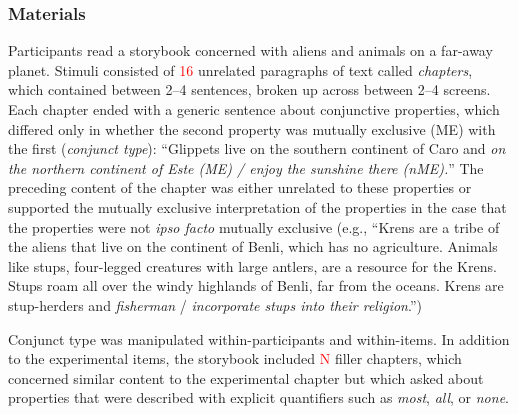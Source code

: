 \documentclass[10pt,letterpaper]{article}
\newcommand{\red}[1]{{\textcolor{Red}{#1}}}
\begin{document}
\subsubsection{Materials}

Participants read a storybook concerned with aliens and animals on a far-away planet.
Stimuli consisted of \red{16} unrelated paragraphs of text called \emph{chapters}, which contained between 2--4 sentences, broken up across between 2--4 screens.
Each chapter ended with a generic sentence about conjunctive properties, which differed only in whether the second property was mutually exclusive (ME) with the first (\emph{conjunct type}): ``Glippets live on the southern continent of Caro and \emph{on the northern continent of Este (ME) /  enjoy the sunshine there (nME).}''
The preceding content of the chapter was either unrelated to these properties or supported the mutually exclusive interpretation of the properties in the case that the properties were not \emph{ipso facto} mutually exclusive (e.g., ``Krens are a tribe of the aliens that live on the continent of Benli, which has no agriculture. Animals like stups, four-legged creatures with large antlers, are a resource for the Krens. Stups roam all over the windy highlands of Benli, far from the oceans. Krens are stup-herders and \emph{fisherman} / \emph{incorporate stups into their religion}.'')

Conjunct type was manipulated within-participants and within-items. 
In addition to the experimental items, the storybook included \red{N} filler chapters, which concerned similar content to the experimental chapter but which asked about properties that were described with explicit quantifiers such as \emph{most}, \emph{all}, or \emph{none}. 

\end{document}
